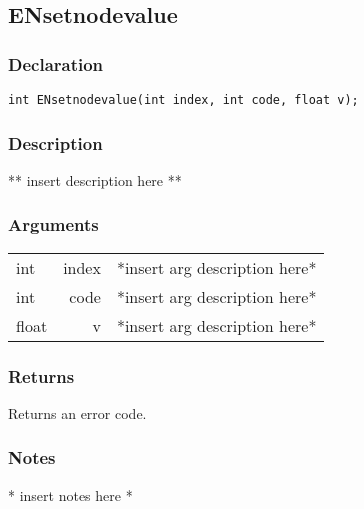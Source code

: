 \subsection{ENsetnodevalue}
\subsubsection{Declaration}
\begin{lstlisting}
int ENsetnodevalue(int index, int code, float v);
\end{lstlisting}
\subsubsection{Description}
** insert description here **
\subsubsection{Arguments}
\begin{tabular}{l r p{11cm} }
int&index&*insert arg description here* \\[6pt]
int&code&*insert arg description here* \\[6pt]
float&v&*insert arg description here* \\[6pt]
\end{tabular}
\subsubsection{Returns}
Returns an error code.
\subsubsection{Notes}
* insert notes here *